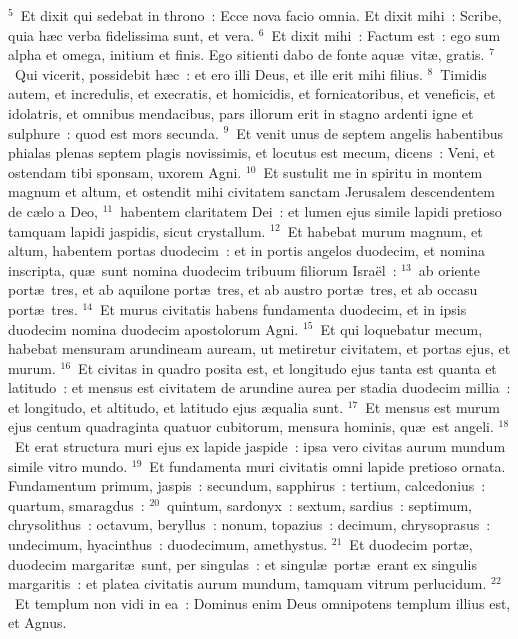 ${}^{5}$~Et dixit qui sedebat in throno~: Ecce nova facio omnia. Et dixit mihi~: Scribe, quia h\ae c verba fidelissima sunt, et vera.
${}^{6}$~Et dixit mihi~: Factum est~: ego sum alpha et omega, initium et finis. Ego sitienti dabo de fonte aqu\ae\ vit\ae , gratis.
${}^{7}$~Qui vicerit, possidebit h\ae c~: et ero illi Deus, et ille erit mihi filius.
${}^{8}$~Timidis autem, et incredulis, et execratis, et homicidis, et fornicatoribus, et veneficis, et idolatris, et omnibus mendacibus, pars illorum erit in stagno ardenti igne et sulphure~: quod est mors secunda.
${}^{9}$~Et venit unus de septem angelis habentibus phialas plenas septem plagis novissimis, et locutus est mecum, dicens~: Veni, et ostendam tibi sponsam, uxorem Agni.
${}^{10}$~Et sustulit me in spiritu in montem magnum et altum, et ostendit mihi civitatem sanctam Jerusalem descendentem de c\ae lo a Deo,
${}^{11}$~habentem claritatem Dei~: et lumen ejus simile lapidi pretioso tamquam lapidi jaspidis, sicut crystallum.
${}^{12}$~Et habebat murum magnum, et altum, habentem portas duodecim~: et in portis angelos duodecim, et nomina inscripta, qu\ae\ sunt nomina duodecim tribuum filiorum Isra\"el~:
${}^{13}$~ab oriente port\ae\ tres, et ab aquilone port\ae\ tres, et ab austro port\ae\ tres, et ab occasu port\ae\ tres.
${}^{14}$~Et murus civitatis habens fundamenta duodecim, et in ipsis duodecim nomina duodecim apostolorum Agni.
${}^{15}$~Et qui loquebatur mecum, habebat mensuram arundineam auream, ut metiretur civitatem, et portas ejus, et murum.
${}^{16}$~Et civitas in quadro posita est, et longitudo ejus tanta est quanta et latitudo~: et mensus est civitatem de arundine aurea per stadia duodecim millia~: et longitudo, et altitudo, et latitudo ejus \ae qualia sunt.
${}^{17}$~Et mensus est murum ejus centum quadraginta quatuor cubitorum, mensura hominis, qu\ae\ est angeli.
${}^{18}$~Et erat structura muri ejus ex lapide jaspide~: ipsa vero civitas aurum mundum simile vitro mundo.
${}^{19}$~Et fundamenta muri civitatis omni lapide pretioso ornata. Fundamentum primum, jaspis~: secundum, sapphirus~: tertium, calcedonius~: quartum, smaragdus~:
${}^{20}$~quintum, sardonyx~: sextum, sardius~: septimum, chrysolithus~: octavum, beryllus~: nonum, topazius~: decimum, chrysoprasus~: undecimum, hyacinthus~: duodecimum, amethystus.
${}^{21}$~Et duodecim port\ae , duodecim margarit\ae\ sunt, per singulas~: et singul\ae\ port\ae\ erant ex singulis margaritis~: et platea civitatis aurum mundum, tamquam vitrum perlucidum.
${}^{22}$~Et templum non vidi in ea~: Dominus enim Deus omnipotens templum illius est, et Agnus.
